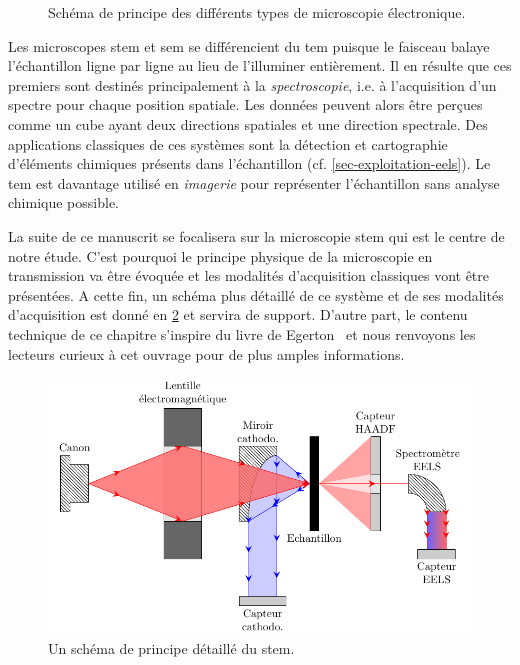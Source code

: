 \begin{figure}[t!]
           \vspace{1em}
       	\caption{Schéma de principe des différents types de microscopie électronique.%
               \protect\label{fig-chap2-micros-electron}}
   \end{figure}

    Les microscopes \gls{stem} et \gls{sem} se différencient du \gls{tem} puisque le faisceau balaye l'échantillon ligne par ligne au lieu de l'illuminer entièrement. Il en résulte que ces premiers sont destinés principalement à la \emph{spectroscopie}, i.e. à l'acquisition d'un spectre pour chaque position spatiale. Les données peuvent alors être perçues comme un cube ayant deux directions spatiales et une direction spectrale. Des applications classiques de ces systèmes sont la détection et cartographie d'éléments chimiques présents dans l'échantillon (cf. \cref{sec-exploitation-eels}). Le \gls{tem} est davantage utilisé en \emph{imagerie} pour représenter l'échantillon sans analyse chimique possible.

    La suite de ce manuscrit se focalisera sur la microscopie \gls{stem} qui est le centre de notre étude. C'est pourquoi le principe physique de la microscopie en transmission va être évoquée et les modalités d'acquisition classiques vont être présentées. A cette fin, un schéma plus détaillé de ce système et de ses modalités d'acquisition est donné en \cref{fig-chap2-stem-detail} et servira de support. D'autre part, le contenu technique de ce chapitre s'inspire du livre de Egerton~\cite{egerton2011electron} et nous renvoyons les lecteurs curieux à cet ouvrage pour de plus amples informations.

    \begin{figure}[htbp]
    	\centering
    	\includegraphics[]{img/chapitre2/figure2/stem-detail.pdf}
    	\caption{Un schéma de principe détaillé du \gls{stem}.
        	\protect\label{fig-chap2-stem-detail}}
    \end{figure}

